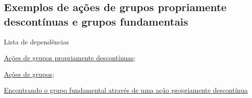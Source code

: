 \subsection{Exemplos de ações de grupos propriamente descontínuas e grupos fundamentais}
\label{ações-de-grupos-e-recobrimentos-ex}
\begin{titlemize}{Lista de dependências}
	\item \hyperref[ações-de-grupo-propriamente-descontínuas-def]{Ações de grupos propriamente descontínuas}; %
	\item \hyperref[ações-de-grupo-def]{Ações de grupos};
    \item \hyperref[ações-de-grupos-e-gr-fundamental-prop]{Encontrando o grupo fundamental através de uma ação propriamente descontínua}
\end{titlemize}

